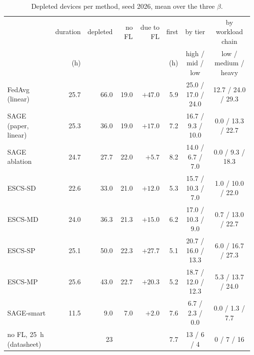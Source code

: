 \documentclass[11pt,a4paper]{article}
\begin{document}
\begin{table}[H]
\centering
\footnotesize
\caption{Depleted devices per method, seed 2026, mean over the three $\beta$.}
\label{tab:deaths}
\setlength{\tabcolsep}{4pt}
\begin{tabular}{lrrrrrcc}
\toprule
& duration & depleted & no FL & due to FL & first & by tier & by workload chain \\
& (h) & & & & (h) & high / mid / low & low / medium / heavy \\
\midrule
FedAvg (linear)        & 25.7 & 66.0 & 19.0 & $+47.0$ & 5.9 & 25.0 / 17.0 / 24.0 & 12.7 / 24.0 / 29.3 \\
SAGE (paper, linear)   & 25.3 & 36.0 & 19.0 & $+17.0$ & 7.2 & 16.7 / \phantom{0}9.3 / 10.0 & \phantom{0}0.0 / 13.3 / 22.7 \\
SAGE ablation          & 24.7 & 27.7 & 22.0 & $+5.7$  & 8.2 & 14.0 / \phantom{0}6.7 / \phantom{0}7.0 & \phantom{0}0.0 / \phantom{0}9.3 / 18.3 \\
ESCS-SD                & 22.6 & 33.0 & 21.0 & $+12.0$ & 5.3 & 15.7 / 10.3 / \phantom{0}7.0 & \phantom{0}1.0 / 10.0 / 22.0 \\
ESCS-MD                & 24.0 & 36.3 & 21.3 & $+15.0$ & 6.2 & 17.0 / 10.3 / \phantom{0}9.0 & \phantom{0}0.7 / 13.0 / 22.7 \\
ESCS-SP                & 25.1 & 50.0 & 22.3 & $+27.7$ & 5.1 & 20.7 / 16.0 / 13.3 & \phantom{0}6.0 / 16.7 / 27.3 \\
ESCS-MP                & 25.6 & 43.0 & 22.7 & $+20.3$ & 5.2 & 18.7 / 12.0 / 12.3 & \phantom{0}5.3 / 13.7 / 24.0 \\
SAGE-smart             & 11.5 & 9.0  & 7.0  & $\mathbf{+2.0}$ & 7.6 & \phantom{0}6.7 / \phantom{0}2.3 / \phantom{0}0.0 & \phantom{0}0.0 / \phantom{0}1.3 / \phantom{0}7.7 \\
\midrule
no FL, 25~h (datasheet) & & 23 & & & 7.7 & 13 / 6 / 4 & 0 / 7 / 16 \\
\bottomrule
\end{tabular}
\end{table}
\end{document}
